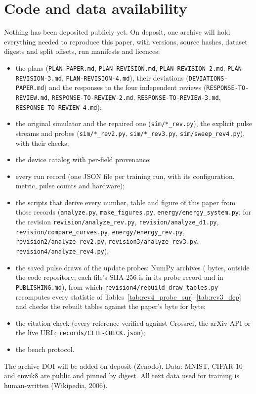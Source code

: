 








\section{Code and data availability}\label{sec:availability}
\begin{sloppypar}
Nothing has been deposited publicly yet. On deposit, one archive will hold everything needed to reproduce this paper, with
versions, source hashes, dataset digests and split offsets, run manifests and licences:
\begin{itemize}
\item the plans (\texttt{PLAN-PAPER.md}, \texttt{PLAN-REVISION.md}, \texttt{PLAN-REVISION-2.md},
      \texttt{PLAN-REVISION-3.md}, \texttt{PLAN-REVISION-4.md}), their deviations (\texttt{DEVIATIONS-PAPER.md}) and the responses to the four
      independent reviews (\texttt{RESPONSE-TO-REVIEW.md}, \texttt{RESPONSE-TO-REVIEW-2.md},
      \texttt{RESPONSE-TO-REVIEW-3.md}, \texttt{RESPONSE-TO-REVIEW-4.md});
\item the original simulator and the repaired one (\texttt{sim/*\_rev.py}), the explicit pulse streams and probes
      (\texttt{sim/*\_rev2.py}, \texttt{sim/*\_rev3.py}, \texttt{sim/sweep\_rev4.py}), with their checks;
\item the device catalog with per-field provenance;
\item every run record (one JSON file per training run, with its configuration, metric, pulse counts and hardware);
\item the scripts that derive every number, table and figure of this paper from those records (\texttt{analyze.py},
      \texttt{make\_figures.py}, \texttt{energy/energy\_system.py}; for the revision \texttt{revision/analyze\_rev.py},
      \texttt{revision/analyze\_d1.py}, \texttt{revision/compare\_curves.py}, \texttt{energy/energy\_rev.py},
      \texttt{revision2/analyze\_rev2.py}, \texttt{revision3/analyze\_rev3.py}, \texttt{revision4/analyze\_rev4.py});
\item the saved pulse draws of the update probes: \RZDrawN{} NumPy archives (\RZDrawBytes{} bytes, outside the code
      repository; each file's SHA-256 is in its probe record and in \texttt{PUBLISHING.md}), from which
      \texttt{revision4/rebuild\_draw\_tables.py} recomputes every statistic of
      Tables~\ref{tab:rev4_probe_sur}--\ref{tab:rev3_dep} and checks the rebuilt tables against the paper's byte for byte;
\item the citation check (every reference verified against Crossref, the arXiv API or the live URL;
      \texttt{records/CITE-CHECK.json});
\item the bench protocol.
\end{itemize}
The archive DOI will be added on deposit (Zenodo). Data: MNIST, CIFAR-10 and enwik8 are public and pinned by digest. All text
data used for training is human-written (Wikipedia, 2006).

\end{sloppypar}

